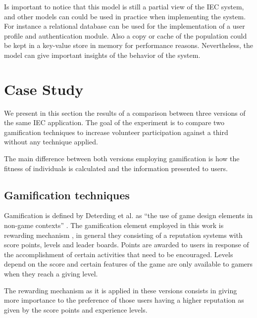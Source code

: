 \documentclass[conference]{IEEEtran}
\begin{document}
Is important to notice that this model is still a partial view of the IEC system,
and other models can could be used in practice when implementing the
system. %
For instance a relational database can be used for the implementation of a
user profile and authentication module. Also a copy or cache of the population 
could be kept in a key-value store in memory for performance reasons. 
Nevertheless, the model can give important insights of the behavior of the 
system.   %

\section{Case Study}
\label{sec:experiments}

We present in this section the results of a comparison between three versions
of the same IEC application. The goal of the experiment is to compare two 
gamification techniques to increase volunteer participation against a third 
without any technique applied.

The main difference between both versions employing gamification is how the fitness of individuals
is calculated and the information presented to users. 

\subsection{Gamification techniques}
\label{sec:gamification}

Gamification is defined by Deterding et al. as
``the use of game design elements in non-game contexts'' \cite{deterding2011game}.
The gamification element employed in this work is rewarding mechanism 
\cite{dubois2013understanding}, in general they consisting of a reputation systems with score points, 
levels and leader boards. Points are awarded to users in response of
the accomplishment of certain activities that need to be encouraged. Levels depend
on the score and certain features of the game are only available to gamers when 
they reach a giving level.

The rewarding mechanism as it is applied in these versions 
consists in giving more importance to the preference of those users having a higher reputation
as given by the score points and experience levels.  
\end{document}

